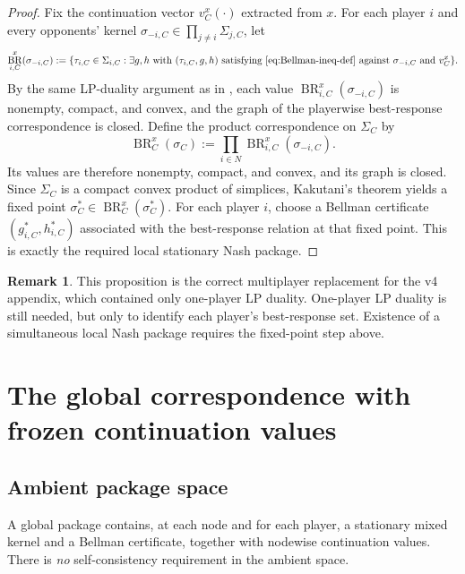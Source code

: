 \documentclass[12pt]{article}
\theoremstyle{definition}
\newtheorem{remark}[theorem]{Remark}
\newcommand{\1}{\mathbf{1}}
\DeclareMathOperator{\BR}{BR}
\begin{document}
\begin{proof}
Fix the continuation vector $v_C^x(\cdot)$ extracted from $x$.  For each player
$i$ and every opponents' kernel $\sigma_{-i,C}\in\prod_{j\ne i}\Sigma_{j,C}$, let
\[
\BR_{i,C}^x(\sigma_{-i,C})
:=
\{\tau_{i,C}\in\Sigma_{i,C}: \exists g,h\text{ with }
(\tau_{i,C},g,h)\text{ satisfying \eqref{eq:Bellman-ineq-def} against }
\sigma_{-i,C}\text{ and }v_C^x\}.
\]
By the same LP-duality argument as in , each value
$\BR_{i,C}^x(\sigma_{-i,C})$ is nonempty, compact, and convex, and the graph of the
playerwise best-response correspondence is closed.  Define the product
correspondence on $\Sigma_C$ by
\[
\BR_C^x(\sigma_C):=\prod_{i\in N}\BR_{i,C}^x(\sigma_{-i,C}).
\]
Its values are therefore nonempty, compact, and convex, and its graph is closed.
Since $\Sigma_C$ is a compact convex product of simplices, Kakutani's theorem
\cite{Kakutani1941} yields a fixed point $\sigma_C^*\in\BR_C^x(\sigma_C^*)$.  For
each player $i$, choose a Bellman certificate $(g_{i,C}^*,h_{i,C}^*)$ associated
with the best-response relation at that fixed point.  This is exactly the required
local stationary Nash package.
\end{proof}

\begin{remark}
This proposition is the correct multiplayer replacement for the v4 appendix, which
contained only one-player LP duality.  One-player LP duality is still needed, but
only to identify each player's best-response set.  Existence of a simultaneous
local Nash package requires the fixed-point step above.
\end{remark}

\section{The global correspondence with frozen continuation values}
\label{sec:global}

\subsection{Ambient package space}

A global package contains, at each node and for each player, a stationary mixed
kernel and a Bellman certificate, together with nodewise continuation values.
There is \emph{no} self-consistency requirement in the ambient space.
\end{document}
